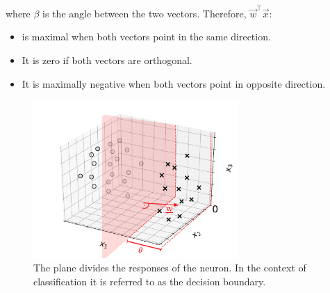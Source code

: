 \begin{frame}
{    where $\beta$ is the angle between the two vectors. Therefore, $\vec w^\top \vec x$:
    
    \begin{itemize}
    \item is maximal when both vectors point in the same direction.
    \item It is zero if both vectors are orthogonal.
    \item It is maximally negative when both vectors point in opposite direction.
    \end{itemize}
    }
   
\end{frame}
\begin{frame}
    
    \begin{figure}[h]
        \centering
        \includegraphics[height=6cm]{img/neuron_3d_grid_hyperplane.pdf}
        \caption{The plane divides the responses of the neuron. In the context of classification it is referred to as the decision boundary.}
        \label{fig:neuron_3d_grid_hyperplane}
    \end{figure}
    
\end{frame}
